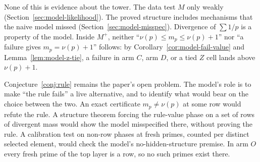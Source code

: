 None of this is evidence about the tower.  The data test $M$ only weakly
(Section~\ref{sec:model-likelihood}).  The proved structure includes
mechanisms that the naive model missed (Section~\ref{sec:model-misspec}).
Divergence of $\sum1/p$ is a property of the model.  Inside $M^+$, neither
``$\nu(p)\leq m_p\leq\nu(p)+1$'' nor ``a failure gives $m_p=\nu(p)+1$''
follows: by Corollary~\ref{cor:model-fail-value} and
Lemma~\ref{lem:model-z-tie}, a failure in arm $C$, arm $D$, or a tied $Z$
cell lands above $\nu(p)+1$.

Conjecture~\ref{conj:rule} remains the paper's open problem.  The model's
role is to make ``the rule fails'' a live alternative, and to identify what
would bear on the choice between the two.  An exact certificate
$m_p\neq\nu(p)$ at some row would refute the rule.  A structure theorem
forcing the rule-value phase on a set of rows of divergent mass would show
the model misspecified there, without proving the rule.  A calibration test
on non-row phases at fresh primes, counted per distinct selected element,
would check the model's no-hidden-structure premise.  In arm $O$ every fresh
prime of the top layer is a row, so no such primes exist there.


